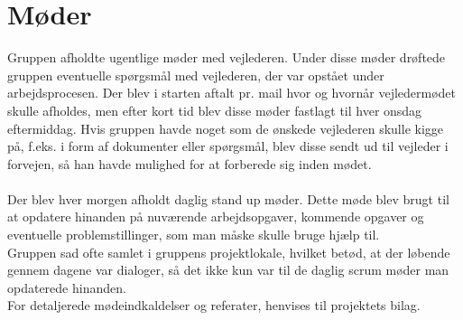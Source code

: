 \section{Møder}
Gruppen afholdte ugentlige møder med vejlederen. Under disse møder drøftede gruppen eventuelle spørgsmål med vejlederen, der var opstået under arbejdsprocesen.
Der blev i starten aftalt pr. mail hvor og hvornår vejledermødet skulle afholdes, men efter kort tid blev disse møder fastlagt til hver onsdag eftermiddag.
Hvis gruppen havde noget som de ønskede vejlederen skulle kigge på, f.eks. i form af dokumenter eller spørgsmål, blev disse sendt ud til vejleder i forvejen, så han havde mulighed for at forberede sig inden mødet. \\ \\
Der blev hver morgen afholdt daglig stand up møder. Dette møde blev brugt til at opdatere hinanden på nuværende arbejdsopgaver, kommende opgaver og eventuelle problemstillinger, som man måske skulle bruge hjælp til. \\
Gruppen sad ofte samlet i gruppens projektlokale, hvilket betød, at der løbende gennem dagene var dialoger, så det ikke kun var til de daglig scrum møder man opdaterede hinanden. \\
For detaljerede mødeindkaldelser og referater, henvises til projektets bilag. \\

\clearpage

